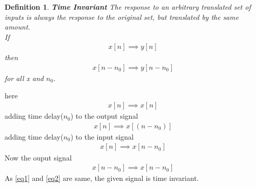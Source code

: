 \documentclass[journal,12pt,twocolumn]{IEEEtran}
\newtheorem{definition}{Definition}[section]
\begin{document}
\begin{definition}{\textbf{Time Invariant}}
The response to an arbitrary translated set of inputs is always the response to the original set, but translated by the same amount.\\
If 
\begin{align}
    x[n]\implies y[n]
\end{align}
then
\begin{align}
    x[n-n_{0}] \implies y[n-n_{0}]
\end{align} for all x and $n_{0}$.
\end{definition}
here 
\begin{align}
    x[n]\implies x[n]
\end{align}
adding time delay($n_{0}$) to the output signal
\begin{align}
\label{eq1}
    x[n]\implies x[(n-n_{0})]
\end{align}
adding time delay($n_{0}$) to the input signal 
\begin{align}
    x[n]\implies x[n-n_{0}]
\end{align}
Now the ouput signal 
\begin{align}
\label{eq2}
    x[n-n_{0}]\implies x[n-n_{0}]
\end{align}
As \ref{eq1} and \ref{eq2} are same, the given signal is time invariant. 
\end{document}
